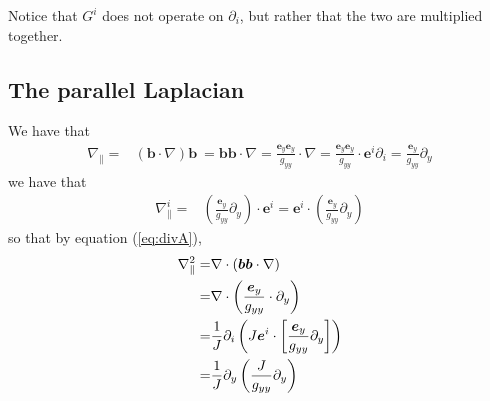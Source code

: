 \documentclass[12pt]{article}
\def\L{\left}
\def\R{\right}
\newcommand{\Grad}{\ensuremath{\nabla}}
\newcommand{\ve}[1]{\ensuremath{\boldsymbol{#1}}}
\newcommand{\Div}[1]{\ensuremath{\nabla\cdot #1 }}
\begin{document}
%
Notice that $G^i$ does not operate on $\partial_i$, but rather that the two are
multiplied together.
%



\subsection{The parallel Laplacian}
%
We have that
%
\begin{align*}
    \Grad_\| =& \L(\ve{b} \cdot \Grad\R) \ve{b}\
             = \ve{b} \ve{b} \cdot \Grad
             = \frac{\ve{e}_y \ve{e}_y}{g_{yy}} \cdot \Grad
             = \frac{\ve{e}_y \ve{e}_y}{g_{yy}} \cdot \ve{e}^i \partial_i
             = \frac{\ve{e}_y}{g_{yy}} \partial_y
\end{align*}
%
we have that
%
\begin{align*}
    \Grad_\|^i =& \L(\frac{\ve{e}_y}{g_{yy}} \partial_y\R)\cdot \ve{e}^i
               = \ve{e}^i \cdot \L(\frac{\ve{e}_y}{g_{yy}} \partial_y\R)
\end{align*}
%
so that by equation (\ref{eq:divA}),
%
\begin{align*}
    \Grad_\|^2 =& \Div\L(\ve{b} \ve{b} \cdot \Grad\R)\\
               =& \Div\L(\frac{\ve{e}_y}{g_{yy}} \cdot \partial_y\R)\\
               =& \frac{1}{J} \partial_i \L(
              J\ve{e}^i \cdot \L[\frac{\ve{e}_y}{g_{yy}} \partial_y\R]
          \R)\\
               =& \frac{1}{J} \partial_y \L(\frac{J}{g_{yy}} \partial_y\R)
\end{align*}
%
\end{document}
